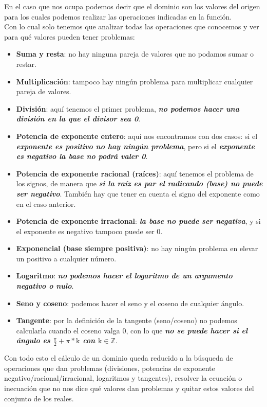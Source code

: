 \documentclass[a4paper,11pt,answers]{exam}
\begin{document}
En el caso que nos ocupa podemos decir que el dominio son los valores del origen para los cuales podemos realizar las operaciones indicadas en la función.\\
Con lo cual solo tenemos que analizar todas las operaciones que conocemos y ver para qué valores pueden tener problemas:
\begin{itemize}
	\item \textbf{Suma y resta}: no hay ninguna pareja de valores que no podamos sumar o restar.
	\item \textbf{Multiplicación}: tampoco hay ningún problema para multiplicar cualquier pareja de valores.
	\item \textbf{División}: aquí tenemos el primer problema, \textbf{\textit{no podemos hacer una división en la que el divisor sea 0}}.
	\item \textbf{Potencia de exponente entero}: aquí nos encontramos con dos casos: si el \textbf{\textit{exponente es positivo no hay ningún problema}}, pero si el \textbf{\textit{exponente es negativo la base no podrá valer 0}}.
	\item \textbf{Potencia de exponente racional (raíces)}: aquí tenemos el problema de los signos, de manera que \textbf{\textit{si la raíz es par el radicando (base) no puede ser negativo}}. También hay que tener en cuenta el signo del exponente como en el caso anterior.
	\item \textbf{Potencia de exponente irracional}:  \textbf{\textit{la base no puede ser negativa}}, y si el exponente es negativo tampoco puede ser 0.
	\item \textbf{Exponencial (base siempre positiva)}: no hay ningún problema en elevar un positivo a cualquier número.
	\item \textbf{Logaritmo}:  \textbf{\textit{no podemos hacer el logaritmo de un argumento negativo o nulo}}.
	\item \textbf{Seno y coseno}: podemos hacer el seno y el coseno de cualquier ángulo.
	\item \textbf{Tangente}: por la definición de la tangente (seno/coseno) no podemos calcularla cuando el coseno valga 0, con lo que \textbf{\textit{no se puede hacer si el ángulo es $\frac{\pi}{2} + \pi*\text{k}$ con $\text{k} \in \mathbb{Z}$}}.
\end{itemize}

Con todo esto el cálculo de un dominio queda reducido a la búsqueda de operaciones que dan problemas (divisiones, potencias de exponente negativo/racional/irracional, logaritmos y tangentes), resolver la ecuación o inecuación que no nos dice qué valores dan problemas y quitar estos valores del conjunto de los reales.\\
\end{document}
